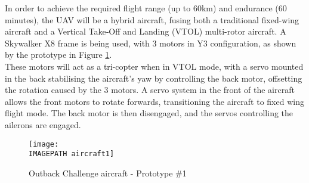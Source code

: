 In order to achieve the required flight range (up to 60km) and endurance (60 minutes), the UAV will be a hybrid aircraft, fusing both a traditional fixed-wing aircraft and a Vertical Take‐Off and Landing (VTOL) multi-rotor aircraft.  A Skywalker X8 frame is being used, with 3 motors in Y3 configuration, as shown by the prototype in Figure \ref{fig:aircraft}.\\

These motors will act as a tri-copter when in VTOL mode, with a servo mounted in the back stabilising the aircraft's yaw by controlling the back motor, offsetting the rotation caused by the 3 motors. A servo system in the front of the aircraft allows the front motors to rotate forwards, transitioning the aircraft to fixed wing flight mode. The back motor is then disengaged, and the servos controlling the ailerons are engaged.\\

\begin{figure}[!h]
	\centering
	\texttt{[image: \\IMAGEPATH aircraft1]}
	\caption{Outback Challenge aircraft - Prototype \#1}
	\label{fig:aircraft}
\end{figure}